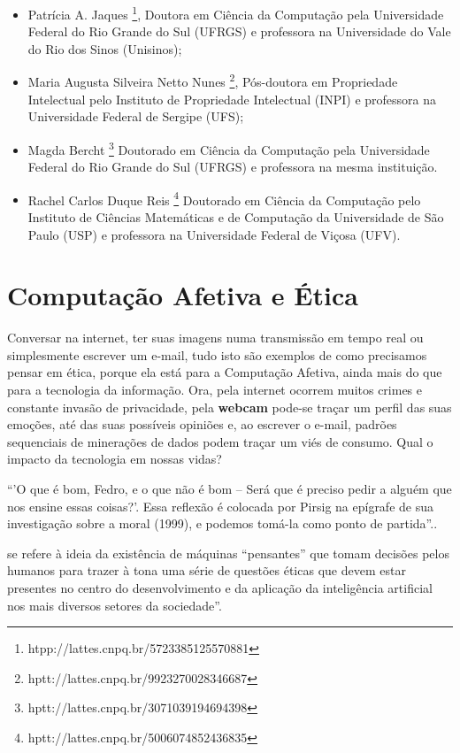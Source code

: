 \documentclass[
    12pt,                   %
    openright,              %
    oneside,                %
    a4paper,                %
    sumario=tradicional,    %
    english,                %
    brazil,                 %
    ]{abntex2}
\begin{document}
\begin{itemize}
  \item Patrícia A. Jaques \footnote[1]{htpp://lattes.cnpq.br/5723385125570881}, Doutora em Ciência da Computação pela Universidade Federal do Rio Grande do Sul (UFRGS) e professora na Universidade do Vale do Rio dos Sinos (Unisinos);
  \item Maria Augusta Silveira Netto Nunes
  \footnote[2]{hptt://lattes.cnpq.br/9923270028346687},
  Pós-doutora em Propriedade Intelectual pelo Instituto de Propriedade Intelectual (INPI) e professora na Universidade Federal de Sergipe (UFS);
  \item Magda Bercht
  \footnote[3]{hptt://lattes.cnpq.br/3071039194694398}
  Doutorado em Ciência da Computação pela Universidade Federal do Rio Grande do Sul (UFRGS) e professora na mesma instituição.
  \item Rachel Carlos Duque Reis
  \footnote[4]{hptt://lattes.cnpq.br/5006074852436835}
  Doutorado em Ciência da Computação pelo Instituto de Ciências Matemáticas e de Computação da Universidade de São Paulo (USP) e professora na Universidade Federal de Viçosa (UFV).
\end{itemize}

\section{Computação Afetiva e Ética}

Conversar na internet, ter suas imagens numa transmissão em tempo real ou simplesmente escrever um e-mail, tudo isto são exemplos de como precisamos pensar em ética, porque ela está para a Computação Afetiva, ainda mais do que para a tecnologia da informação. Ora, pela internet ocorrem muitos crimes e constante invasão de privacidade, pela \textbf{webcam} pode-se traçar um perfil das suas emoções, até das suas possíveis opiniões e, ao escrever o e-mail, padrões sequenciais de minerações de dados podem traçar um viés de consumo. Qual o impacto da tecnologia em nossas vidas?

``'O que é bom, Fedro, e o que não é bom – Será que é preciso pedir a alguém que nos ensine essas coisas?'. Essa reflexão é colocada por Pirsig na epígrafe de sua investigação sobre a moral (1999), e podemos tomá-la como ponto de partida''.\cite{Holanda2018}.

 se refere à ideia da existência de máquinas “pensantes” que tomam decisões pelos humanos para trazer à tona uma série de questões éticas que devem estar presentes no centro do desenvolvimento e da aplicação da inteligência artificial nos mais diversos setores da sociedade''.
\end{document}
